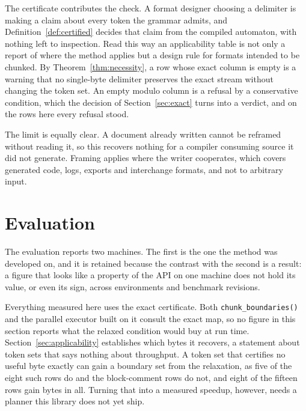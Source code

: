 \documentclass[11pt,a4paper]{article}
\theoremstyle{definition}
\theoremstyle{plain}
\newcommand{\code}[1]{\texttt{#1}}
\begin{document}
The certificate contributes the check. A format designer choosing a delimiter is making a claim about every token the
grammar admits, and Definition~\ref{def:certified} decides that claim from the compiled automaton, with nothing left to
inspection. Read this way an applicability table is not only a report of where the method applies but a design rule for
formats intended to be chunked. By Theorem~\ref{thm:necessity}, a row whose exact column is empty is a warning that no
single-byte delimiter preserves the exact stream without changing the token set. An empty modulo column is a refusal by
a conservative condition, which the decision of Section~\ref{sec:exact} turns into a verdict, and on the rows here every
refusal stood.

The limit is equally clear. A document already written cannot be reframed without reading it, so this recovers nothing
for a compiler consuming source it did not generate. Framing applies where the writer cooperates, which covers generated
code, logs, exports and interchange formats, and not to arbitrary input.

\section{Evaluation}
\label{sec:evaluation}

The evaluation reports two machines. The first is the one the method was developed on, and it is retained because the
contrast with the second is a result: a figure that looks like a property of the API on one machine does not hold its
value, or even its sign, across environments and benchmark revisions.

Everything measured here uses the exact certificate. Both \code{chunk\_boundaries()} and the parallel executor built on
it consult the exact map, so no figure in this section reports what the relaxed condition would buy at run time.
Section~\ref{sec:applicability} establishes which bytes it recovers, a statement about token sets that says nothing
about throughput. A token set that certifies no useful byte exactly can gain a boundary set from the relaxation, as five
of the eight such rows do and the block-comment rows do not, and eight of the fifteen rows gain bytes in all. Turning
that into a measured speedup, however, needs a planner this library does not yet ship.
\end{document}
